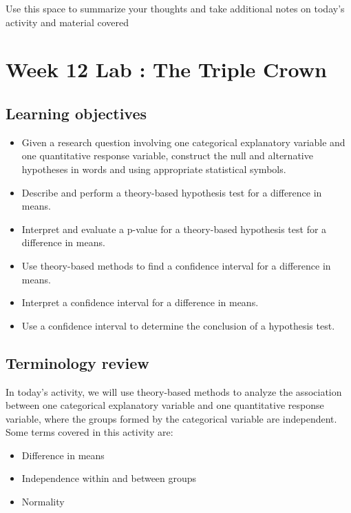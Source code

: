 \documentclass[
]{report}
\begin{document}
Use this space to summarize your thoughts and take additional notes on today's activity and material covered

\newpage

\hypertarget{week-12-lab-the-triple-crown}{%
\section{Week 12 Lab : The Triple Crown}\label{week-12-lab-the-triple-crown}}


\hypertarget{learning-objectives-18}{%
\subsection{Learning objectives}\label{learning-objectives-18}}

\begin{itemize}
\item
  Given a research question involving one categorical explanatory variable and one quantitative response variable, construct the null and alternative hypotheses
  in words and using appropriate statistical symbols.
\item
  Describe and perform a theory-based hypothesis test for a difference in means.
\item
  Interpret and evaluate a p-value for a theory-based hypothesis test for a difference in means.
\item
  Use theory-based methods to find a confidence interval for a difference in means.
\item
  Interpret a confidence interval for a difference in means.
\item
  Use a confidence interval to determine the conclusion of a hypothesis test.
\end{itemize}

\hypertarget{terminology-review-19}{%
\subsection{Terminology review}\label{terminology-review-19}}

In today's activity, we will use theory-based methods to analyze the association between one categorical explanatory variable and one quantitative response variable, where the groups formed by the categorical variable are independent. Some terms covered in this activity are:

\begin{itemize}
\item
  Difference in means
\item
  Independence within and between groups
\item
  Normality
\end{itemize}
\end{document}
